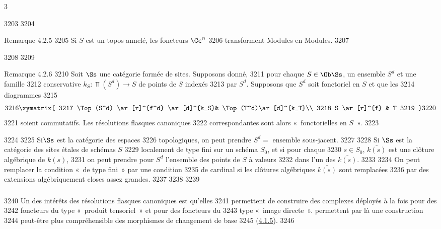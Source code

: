 3	\documentclass[10pt]{../fichiers-configuration-latex/smfart}
\begin{document}
  3203	
  3204	\begin{enonce*}[remark]{Remarque 4.2.5}
  3205	Si $S$ est un topos annelé, les foncteurs $\Cc^{n}$
  3206	transforment Modules en Modules.
  3207	\end{enonce*}
  3208	
  3209	\begin{enonce*}[remark]{Remarque 4.2.6}
  3210	Soit $\Ss$ une catégorie formée de sites. Supposons donné,
  3211	pour chaque $S\in \Ob \Ss$, un ensemble $S^{d}$ et une famille
  3212	conservative $k_{S}:\Top(S^{d})\rightarrow S$ de points de $S$ indexés
  3213	par $S^{d}$. Supposons que $S^{d}$ soit fonctoriel en $S$ et que les
  3214	diagrammes
  3215	\[
  3216	\xymatrix{
  3217	\Top(S^d)   \ar[r]^{f^d} \ar[d]^{k_S}& \Top(T^d)\ar[d]^{k_T}\\
  3218	S        \ar[r]^{f}  & T
  3219	}
  3220	\]
  3221	soient commutatifs. Les résolutions flasques canoniques
  3222	correspondantes sont alors « fonctorielles en $S$ ».
  3223	\end{enonce*}
  3224	
  3225	Si\pageoriginale $\Ss$ est la catégorie des espaces
  3226	topologiques, on peut prendre $S^{d}=$ ensemble sous-jacent.
  3227	
  3228	Si $\Ss$ est la catégorie des sites étales de schémas $S$
  3229	localement de type fini sur un schéma $S_{0}$, et si pour chaque
  3230	$s\in S_{0}$, $\bar{k(s)}$ est une clôture algébrique de $k(s)$,
  3231	on peut prendre pour $S^{d}$ l'ensemble des points de $S$ à valeurs
  3232	dans l'un des $\bar{k(s)}$.
  3233	
  3234	On peut remplacer la condition « de type fini »  par une condition
  3235	de cardinal si les clôtures algébriques $\bar{k(s)}$ sont remplacées
  3236	par des extensions algébriquement closes assez grandes.
  3237	
  3238	\setcounter{subsubsection}{6}
  3239	\subsubsection{}
  3240	Un des intérêts des résolutions flasques canoniques est qu'elles
  3241	permettent de construire des complexes déployés à la fois pour des
  3242	foncteurs du type « produit tensoriel »  et pour des foncteurs du
  3243	type « image directe ».  permettent par là une construction
  3244	peut-être plus compréhensible des morphismes de changement de base
  3245	(\hyperref[XVII.prop4.1.5]{4.1.5}).
  3246	
\end{document}
